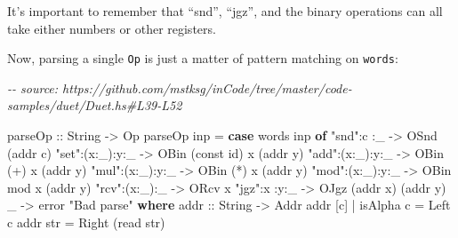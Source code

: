 \documentclass[]{article}
\newenvironment{Shaded}{}{}
\newcommand{\CommentTok}[1]{\textcolor[rgb]{0.38,0.63,0.69}{\textit{#1}}}
\newcommand{\DataTypeTok}[1]{\textcolor[rgb]{0.56,0.13,0.00}{#1}}
\newcommand{\FunctionTok}[1]{\textcolor[rgb]{0.02,0.16,0.49}{#1}}
\newcommand{\KeywordTok}[1]{\textcolor[rgb]{0.00,0.44,0.13}{\textbf{#1}}}
\newcommand{\NormalTok}[1]{#1}
\newcommand{\OperatorTok}[1]{\textcolor[rgb]{0.40,0.40,0.40}{#1}}
\newcommand{\OtherTok}[1]{\textcolor[rgb]{0.00,0.44,0.13}{#1}}
\newcommand{\StringTok}[1]{\textcolor[rgb]{0.25,0.44,0.63}{#1}}
\begin{document}
It's important to remember that ``snd'', ``jgz'', and the binary operations can
all take either numbers or other registers.

Now, parsing a single \texttt{Op} is just a matter of pattern matching on
\texttt{words}:

\begin{Shaded}
\begin{Highlighting}[]
\CommentTok{{-}{-} source: https://github.com/mstksg/inCode/tree/master/code{-}samples/duet/Duet.hs\#L39{-}L52}

\OtherTok{parseOp ::} \DataTypeTok{String} \OtherTok{{-}\textgreater{}} \DataTypeTok{Op}
\NormalTok{parseOp inp }\OtherTok{=} \KeywordTok{case} \FunctionTok{words}\NormalTok{ inp }\KeywordTok{of}
    \StringTok{"snd"}\OperatorTok{:}\NormalTok{c    }\OperatorTok{:}\NormalTok{\_   }\OtherTok{{-}\textgreater{}} \DataTypeTok{OSnd}\NormalTok{ (addr c)}
    \StringTok{"set"}\OperatorTok{:}\NormalTok{(x}\OperatorTok{:}\NormalTok{\_)}\OperatorTok{:}\NormalTok{y}\OperatorTok{:}\NormalTok{\_ }\OtherTok{{-}\textgreater{}} \DataTypeTok{OBin}\NormalTok{ (}\FunctionTok{const} \FunctionTok{id}\NormalTok{) x (addr y)}
    \StringTok{"add"}\OperatorTok{:}\NormalTok{(x}\OperatorTok{:}\NormalTok{\_)}\OperatorTok{:}\NormalTok{y}\OperatorTok{:}\NormalTok{\_ }\OtherTok{{-}\textgreater{}} \DataTypeTok{OBin}\NormalTok{ (}\OperatorTok{+}\NormalTok{)        x (addr y)}
    \StringTok{"mul"}\OperatorTok{:}\NormalTok{(x}\OperatorTok{:}\NormalTok{\_)}\OperatorTok{:}\NormalTok{y}\OperatorTok{:}\NormalTok{\_ }\OtherTok{{-}\textgreater{}} \DataTypeTok{OBin}\NormalTok{ (}\OperatorTok{*}\NormalTok{)        x (addr y)}
    \StringTok{"mod"}\OperatorTok{:}\NormalTok{(x}\OperatorTok{:}\NormalTok{\_)}\OperatorTok{:}\NormalTok{y}\OperatorTok{:}\NormalTok{\_ }\OtherTok{{-}\textgreater{}} \DataTypeTok{OBin} \FunctionTok{mod}\NormalTok{        x (addr y)}
    \StringTok{"rcv"}\OperatorTok{:}\NormalTok{(x}\OperatorTok{:}\NormalTok{\_)}\OperatorTok{:}\NormalTok{\_   }\OtherTok{{-}\textgreater{}} \DataTypeTok{ORcv}\NormalTok{ x}
    \StringTok{"jgz"}\OperatorTok{:}\NormalTok{x    }\OperatorTok{:}\NormalTok{y}\OperatorTok{:}\NormalTok{\_ }\OtherTok{{-}\textgreater{}} \DataTypeTok{OJgz}\NormalTok{ (addr x) (addr y)}
\NormalTok{    \_               }\OtherTok{{-}\textgreater{}} \FunctionTok{error} \StringTok{"Bad parse"}
  \KeywordTok{where}
\OtherTok{    addr ::} \DataTypeTok{String} \OtherTok{{-}\textgreater{}} \DataTypeTok{Addr}
\NormalTok{    addr [c] }\OperatorTok{|} \FunctionTok{isAlpha}\NormalTok{ c }\OtherTok{=} \DataTypeTok{Left}\NormalTok{ c}
\NormalTok{    addr str }\OtherTok{=} \DataTypeTok{Right}\NormalTok{ (}\FunctionTok{read}\NormalTok{ str)}
\end{Highlighting}
\end{Shaded}
\end{document}
